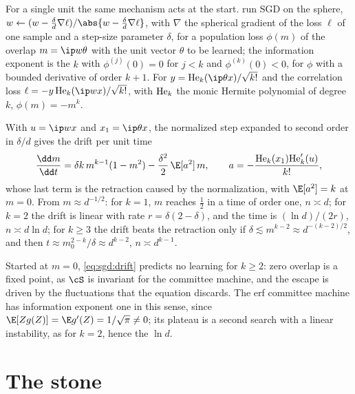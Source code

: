 \begin{refsection}
For a single unit the same mechanism acts at the start. \Textcite{BenArousGheissariJagannath2021} run SGD on the sphere, $w\leftarrow(w-\frac\delta d\nabla\ell)/\abs{w-\frac\delta d\nabla\ell}$, with $\nabla$ the spherical gradient of the loss $\ell$ of one sample and a step-size parameter $\delta$, for a population loss $\phi(m)$ of the overlap $m=\ip w\theta$ with the unit vector $\theta$ to be learned; the information exponent is the $k$ with $\phi^{(j)}(0)=0$ for $j<k$ and $\phi^{(k)}(0)<0$, for $\phi$ with a bounded derivative of order $k+1$. For $y=\sgdHe_k(\ip\theta x)/\sqrt{k!}$ and the correlation loss $\ell=-y\,\sgdHe_k(\ip wx)/\sqrt{k!}$, with $\mathrm{He}_k$ the monic Hermite polynomial of degree $k$, $\phi(m)=-m^k$.

\begin{heuristic}
With $u=\ip wx$ and $x_1=\ip\theta x$, the normalized step expanded to second order in $\delta/d$ gives the drift per unit time
\begin{equation}\label{eq:sgd:drift}
\frac{\dd m}{\dd t}=\delta k\,m^{k-1}(1-m^2)-\frac{\delta^2}2\,\E[a^2]\,m,\qquad a=-\frac{\sgdHe_k(x_1)\sgdHe_k'(u)}{k!},
\end{equation}
whose last term is the retraction caused by the normalization, with $\E[a^2]=k$ at $m=0$. From $m\approx d^{-1/2}$: for $k=1$, $m$ reaches $\frac12$ in a time of order one, $n\asymp d$; for $k=2$ the drift is linear with rate $r=\delta(2-\delta)$, and the time is $(\ln d)/(2r)$, $n\asymp d\ln d$; for $k\ge3$ the drift beats the retraction only if $\delta\lesssim m^{k-2}\approx d^{-(k-2)/2}$, and then $t\approx m_0^{2-k}/\delta\approx d^{k-2}$, $n\asymp d^{k-1}$.
\end{heuristic}

Started at $m=0$, \eqref{eq:sgd:drift} predicts no learning for $k\ge2$: zero overlap is a fixed point, as $\cS$ is invariant for the committee machine, and the escape is driven by the fluctuations that the equation discards. The erf committee machine has information exponent one in this sense, since $\E[Zg(Z)]=\E g'(Z)=1/\sqrt\pi\ne0$; its plateau is a second search with a linear instability, as for $k=2$, hence the $\ln d$.

\section{The stone}\label{sec:sgd:stone}


\end{refsection}
